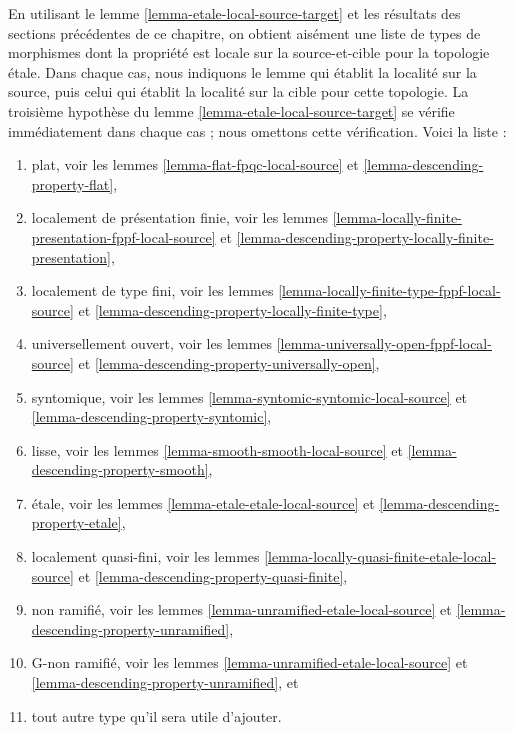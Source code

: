 \begin{remark}
\label{remark-list-local-source-target}
En utilisant le lemme \ref{lemma-etale-local-source-target} et les résultats
des sections précédentes de ce chapitre, on obtient aisément une liste de
types de morphismes dont la propriété est locale sur la source-et-cible pour
la topologie \'etale. Dans chaque cas, nous indiquons le lemme qui établit la
localité sur la source, puis celui qui établit la localité sur la cible pour
cette topologie. La troisième hypothèse du
lemme \ref{lemma-etale-local-source-target} se vérifie immédiatement dans
chaque cas ; nous omettons cette vérification. Voici la liste :
\begin{enumerate}
\item plat, voir les lemmes \ref{lemma-flat-fpqc-local-source} et
\ref{lemma-descending-property-flat},
\item localement de présentation finie, voir les lemmes
\ref{lemma-locally-finite-presentation-fppf-local-source} et
\ref{lemma-descending-property-locally-finite-presentation},
\item localement de type fini, voir les lemmes
\ref{lemma-locally-finite-type-fppf-local-source} et
\ref{lemma-descending-property-locally-finite-type},
\item universellement ouvert, voir les lemmes
\ref{lemma-universally-open-fppf-local-source} et
\ref{lemma-descending-property-universally-open},
\item syntomique, voir les lemmes \ref{lemma-syntomic-syntomic-local-source} et
\ref{lemma-descending-property-syntomic},
\item lisse, voir les lemmes \ref{lemma-smooth-smooth-local-source} et
\ref{lemma-descending-property-smooth},
\item \'etale, voir les lemmes \ref{lemma-etale-etale-local-source} et
\ref{lemma-descending-property-etale},
\item localement quasi-fini, voir les lemmes
\ref{lemma-locally-quasi-finite-etale-local-source} et
\ref{lemma-descending-property-quasi-finite},
\item non ramifié, voir les lemmes \ref{lemma-unramified-etale-local-source} et
\ref{lemma-descending-property-unramified},
\item G-non ramifié, voir les lemmes
\ref{lemma-unramified-etale-local-source} et
\ref{lemma-descending-property-unramified}, et
\item tout autre type qu'il sera utile d'ajouter.
\end{enumerate}
\end{remark}


